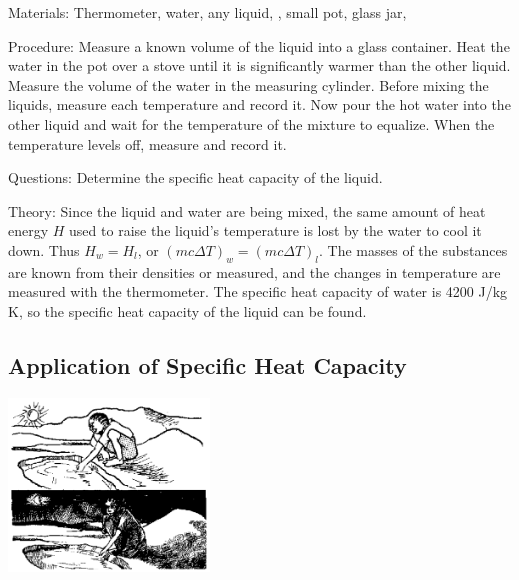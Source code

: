 \begin{multicols}{2}
\begin{description*}
\item[Materials:]{Thermometer, water, any liquid, , small pot, glass jar, }
\item[Procedure:]{Measure a known volume of the liquid into a glass container. Heat the water in the pot over a stove until it is significantly warmer than the other liquid. Measure the volume of the water in the measuring cylinder. Before mixing the liquids, measure each temperature and record it. Now pour the hot water into the other liquid and wait for the temperature of the mixture to equalize. When the temperature levels off, measure and record it.}
\item[Questions:]{Determine the specific heat capacity of the liquid.}
\item[Theory:]{Since the liquid and water are being mixed, the same amount of heat energy $H$ used to raise the liquid’s temperature is lost by the water to cool it down. Thus $H_w = H_l$, or $(mc\Delta T)_{w} = (mc\Delta T)_{l}$. The masses of the substances are known from their densities or measured, and the changes in temperature are measured with the thermometer. The specific heat capacity of water is 4200 J/kg K, so the specific heat capacity of the liquid can be found.}
\end{description*}

\subsection{Application of Specific Heat Capacity}

\begin{center}
\includegraphics[width=0.4\textwidth]{./img/source/shc-app.png}
\end{center}


\end{multicols}
